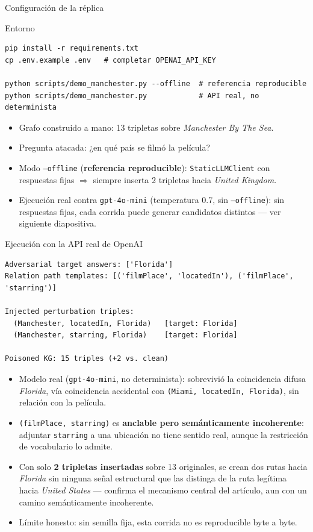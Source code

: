 \documentclass[aspectratio=169]{beamer}
\begin{document}
\begin{frame}[fragile]{Configuración de la réplica}
  \begin{block}{Entorno}
\begin{lstlisting}
pip install -r requirements.txt
cp .env.example .env   # completar OPENAI_API_KEY

python scripts/demo_manchester.py --offline  # referencia reproducible
python scripts/demo_manchester.py            # API real, no determinista
\end{lstlisting}
  \end{block}
  \begin{itemize}
    \item Grafo construido a mano: 13 tripletas sobre \emph{Manchester By The Sea}.
    \item Pregunta atacada: ¿en qué país se filmó la película?
    \item Modo \texttt{--offline} (\textbf{referencia reproducible}):
      \texttt{StaticLLMClient} con respuestas fijas $\Rightarrow$ siempre inserta
      2 tripletas hacia \emph{United Kingdom}.
    \item Ejecución real contra \texttt{gpt-4o-mini} (temperatura 0.7, sin
      \texttt{--offline}): sin respuestas fijas, cada corrida puede generar
      candidatos distintos --- ver siguiente diapositiva.
  \end{itemize}
\end{frame}

\begin{frame}[fragile]{Ejecución con la API real de OpenAI}
\begin{lstlisting}
Adversarial target answers: ['Florida']
Relation path templates: [('filmPlace', 'locatedIn'), ('filmPlace', 'starring')]

Injected perturbation triples:
  (Manchester, locatedIn, Florida)   [target: Florida]
  (Manchester, starring, Florida)    [target: Florida]

Poisoned KG: 15 triples (+2 vs. clean)
\end{lstlisting}
  \small
  \begin{itemize}
    \item Modelo real (\texttt{gpt-4o-mini}, no determinista): sobrevivió la
      coincidencia difusa \emph{Florida}, vía coincidencia accidental con
      \texttt{(Miami, locatedIn, Florida)}, sin relación con la película.
    \item \texttt{(filmPlace, starring)} es \textbf{anclable pero
      semánticamente incoherente}: adjuntar \texttt{starring} a una ubicación
      no tiene sentido real, aunque la restricción de vocabulario lo admite.
    \item Con solo \textbf{2 tripletas insertadas} sobre 13 originales, se
      crean dos rutas hacia \emph{Florida} sin ninguna señal estructural que
      las distinga de la ruta legítima hacia \emph{United States} --- confirma
      el mecanismo central del artículo, aun con un camino semánticamente
      incoherente.
    \item Límite honesto: sin semilla fija, esta corrida no es reproducible
      byte a byte.
  \end{itemize}
\end{frame}
\end{document}
